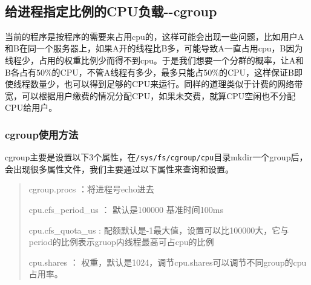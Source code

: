 \begin{Shaded}
\begin{Highlighting}[]
\NormalTok{　　　　　　　　　　首先运行:[}\ExtensionTok{~}\NormalTok{]# }\KeywordTok{|} 
\NormalTok{　　　　　　　　　　其次运行:[}\ExtensionTok{~}\NormalTok{]# }
\NormalTok{　　　　　　　　　　最后运行:[}\ExtensionTok{~}\NormalTok{]# }\KeywordTok{|} 

\end{Highlighting}
\end{Shaded}

\hypertarget{header-n91}{%
\subsection{给进程指定比例的CPU负载-\/-cgroup}\label{header-n91}}

当前的程序是按程序的需要来占用cpu的，这样可能会出现一些问题，比如用户A和B在同一个服务器上，如果A开的线程比B多，可能导致A一直占用cpu，B因为线程少，占用的权重比例少而得不到cpu。于是我们想要一个分群的概率，让A和B各占有50\%的CPU，不管A线程有多少，最多只能占50\%的CPU，这样保证B即使线程数量少，也可以得到足够的CPU来运行。同样的道理类似于计费的网络带宽，可以根据用户缴费的情况分配CPU，如果未交费，就算CPU空闲也不分配CPU给用户。

\hypertarget{header-n94}{%
\subsubsection{cgroup使用方法}\label{header-n94}}

cgroup主要是设置以下3个属性，在\texttt{/sys/fs/cgroup/cpu}目录mkdir一个group后，会出现很多属性文件，我们主要通过以下属性来查询和设置。

\begin{quote}
cgroup.procs ：将进程号echo进去

cpu.cfs\_period\_us ： 默认是100000 基准时间100ms

cpu.cfs\_quota\_us :
配额默认是-1最大值，设置可以比100000大，它与period的比例表示gruop内线程最高可占cpu的比例

cpu.shares ：
权重，默认是1024，调节cpu.shares可以调节不同group的cpu占用率。
\end{quote}

